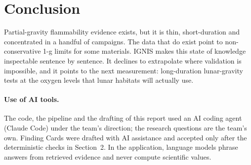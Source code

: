 \documentclass[10pt]{article}
\begin{document}
\section{Conclusion}
Partial-gravity flammability evidence exists, but it is thin, short-duration and concentrated in a handful of
campaigns. The data that do exist point to non-conservative 1-g limits for some materials. IGNIS makes this state of
knowledge inspectable sentence by sentence. It declines to extrapolate where validation is impossible, and it
points to the next measurement: long-duration lunar-gravity tests at the oxygen levels that lunar habitats will
actually use.

\paragraph{Use of AI tools.}
The code, the pipeline and the drafting of this report used an AI coding agent (Claude Code) under the team's
direction; the research questions are the team's own. Finding Cards were drafted with AI assistance and accepted
only after the deterministic checks in Section~2. In the application, language models phrase answers from
retrieved evidence and never compute scientific values.
\end{document}
